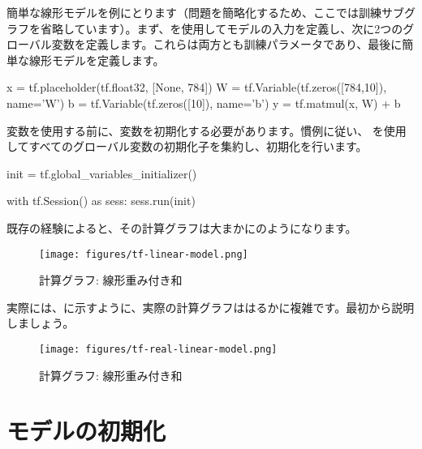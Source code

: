 \begin{content}

簡単な線形モデルを例にとります（問題を簡略化するため、ここでは訓練サブグラフを省略しています）。まず、を使用してモデルの入力を定義し、次に2つのグローバル変数を定義します。これらは両方とも訓練パラメータであり、最後に簡単な線形モデルを定義します。

\begin{leftbar}
\begin{python}
x  = tf.placeholder(tf.float32, [None, 784])
W = tf.Variable(tf.zeros([784,10]), name='W')
b = tf.Variable(tf.zeros([10]), name='b') 
y = tf.matmul(x, W) + b
\end{python}
\end{leftbar}

変数を使用する前に、変数を初期化する必要があります。慣例に従い、
を使用してすべてのグローバル変数の初期化子を集約し、初期化を行います。

\begin{leftbar}
\begin{python}
init = tf.global_variables_initializer()

with tf.Session() as sess:
  sess.run(init)
\end{python}
\end{leftbar}

既存の経験によると、その計算グラフは大まかにのようになります。

\begin{figure}[!h]
\centering
\texttt{[image: figures/tf-linear-model.png]}
\caption{計算グラフ: 線形重み付き和}
 \label{fig:tf-linear-model}
\end{figure}

実際には、に示すように、実際の計算グラフははるかに複雑です。最初から説明しましょう。

\begin{figure}[!h]
\centering
\texttt{[image: figures/tf-real-linear-model.png]}
\caption{計算グラフ: 線形重み付き和}
 \label{fig:tf-real-linear-model}
\end{figure}

\end{content}

\section{モデルの初期化}

